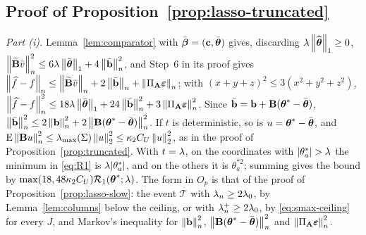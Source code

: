 \subsection*{Proof of Proposition~\ref{prop:lasso-truncated}}

\emph{Part (i).} Lemma~\ref{lem:comparator} with $\bar\bbeta = (\bc,\thbar)$
gives, discarding $\pen\norm{\thetahat}_{1} \ge 0$,
$\normn{\Btil\bar v}^{2} \le 6\pen\norm{\thbar}_{1} + 4\normn{\bbar}^{2}$,
and Step~6 in its proof gives $\normn{\widehat{f}-f} \le \normn{\Btil\bar v}
+ 2\normn{\bbar} + \normn{\PA\bveps}$; with
$(x+y+z)^{2} \le 3(x^{2}+y^{2}+z^{2})$, $\normn{\widehat{f}-f}^{2} \le
18\pen\norm{\thbar}_{1} + 24\normn{\bbar}^{2} + 3\normn{\PA\bveps}^{2}$.
Since $\bbar = \bb + \Bmat(\thetastar-\thbar)$, $\normn{\bbar}^{2} \le
2\normn{\bb}^{2} + 2\normn{\Bmat(\thetastar-\thbar)}^{2}$. If $t$ is
deterministic, so is $u = \thetastar-\thbar$, and
$\E\normn{\Bmat u}^{2} \le \lmaxx(\Gram)\norm{u}_{2}^{2} \le
\kappa_2C_U\norm{u}_{2}^{2}$, as in the proof of
Proposition~\ref{prop:truncated}. With $t = \pen$, on the coordinates with
$|\theta^{*}_{a}| > \pen$ the minimum in \eqref{eq:R1} is
$\pen|\theta^{*}_{a}|$, and on the others it is $\theta^{*2}_{a}$; summing
gives the bound by $\max(18,48\kappa_2C_U)\Rone(\thetastar;\pen)$. The form
in $O_p$ is that of the proof of Proposition~\ref{prop:lasso-slow}: the
event $\mathcal{T}$ with $\penn \ge 2\pen_0$, by Lemma~\ref{lem:columns}
below the ceiling, or with $\penn^{+} \ge 2\pen_0$, by
\eqref{eq:smax-ceiling} for every $J$, and Markov's inequality for
$\normn{\bb}^{2}$, $\normn{\Bmat(\thetastar-\thbar)}^{2}$ and
$\normn{\PA\bveps}^{2}$.

